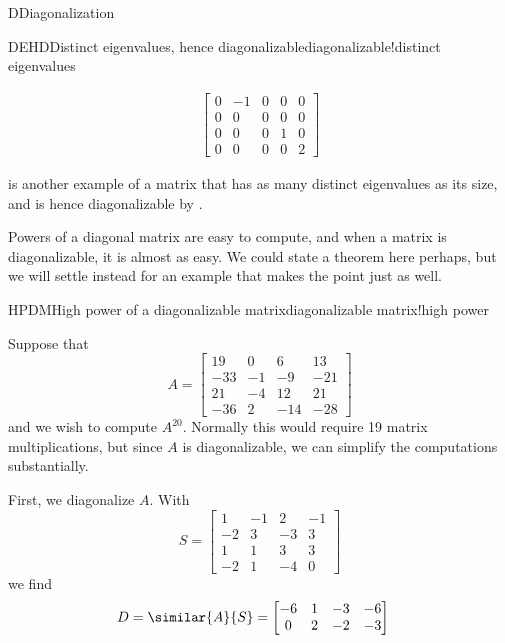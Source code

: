 \begin{subsect}{D}{Diagonalization}
\begin{example}{DEHD}{Distinct eigenvalues, hence diagonalizable}{diagonalizable!distinct eigenvalues}
\begin{para}
\begin{align*}
\begin{bmatrix}
0 & -1 & 0 & 0 & 0\\
0 & 0 & 0 & 0 & 0\\
0 & 0 & 0 & 1 & 0\\
0 & 0 & 0 & 0 & 2
\end{bmatrix}
%
\end{align*}
\end{para}
%
\end{example}
%
\begin{para} is another example of a matrix that has as many distinct eigenvalues as its size, and is hence diagonalizable by .\end{para}
%
\begin{para}Powers of a diagonal matrix are easy to compute, and when a matrix is diagonalizable, it is almost as easy.  We could state a theorem here perhaps, but we will settle instead for an example that makes the point just as well.\end{para}
%
\begin{example}{HPDM}{High power of a diagonalizable matrix}{diagonalizable matrix!high power}
%
\begin{para}Suppose that
%
\begin{equation*}
A=\begin{bmatrix}
 19 & 0 & 6 & 13 \\
 -33 & -1 & -9 & -21 \\
 21 & -4 & 12 & 21 \\
 -36 & 2 & -14 & -28
\end{bmatrix}
\end{equation*}
%
and we wish to compute $A^{20}$.  Normally this would require 19 matrix multiplications, but since $A$ is diagonalizable, we can simplify the computations substantially.\end{para}
%
\begin{para}First, we diagonalize $A$.  With
%
\begin{equation*}
S=\begin{bmatrix}
 1 & -1 & 2 & -1 \\
 -2 & 3 & -3 & 3 \\
 1 & 1 & 3 & 3 \\
 -2 & 1 & -4 & 0
\end{bmatrix}
\end{equation*}
%
we find
%
\begin{align*}
%
D=\similar{A}{S}
&=
\begin{bmatrix}
 -6 & 1 & -3 & -6 \\
 0 & 2 & -2 & -3 \\

\end{bmatrix}
\end{align*}
\end{para}
\end{example}
\end{subsect}
